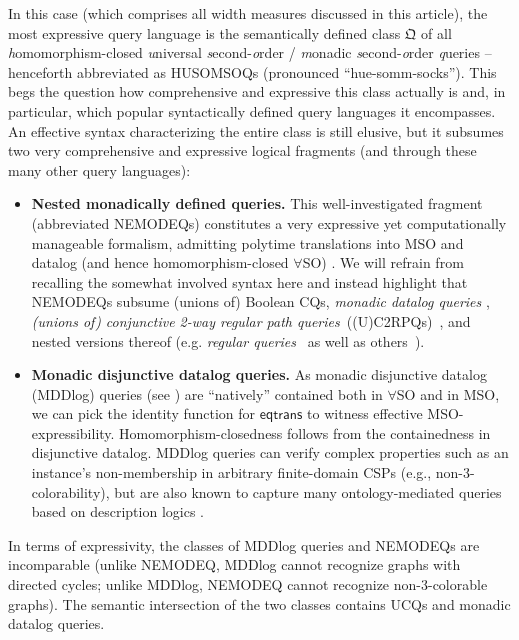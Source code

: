 \documentclass[10pt,a4paper]{amsart}
\theoremstyle{definition}
\numberwithin{equation}{section}
\theoremstyle{plain}
\theoremstyle{definition}
\newcommand{\remarkstart}{\color{black}}
\theoremstyle{myexample}
\theoremstyle{plain}
\theoremstyle{definition}
\newcommand{\fcn}[1]{\mathsf{#1}}
\begin{document}
\medskip {}
In this case (which comprises all width measures discussed in this article), the most expressive query language is the semantically defined class $\mathfrak{Q}$ of all \emph{h}omomorphism-closed \emph{u}niversal \emph{s}econd-\emph{o}rder / \emph{m}onadic \emph{s}econd-\emph{o}rder \emph{q}ueries -- henceforth abbreviated as HUSOMSOQs (pronounced ``hue-somm-socks''). This begs the question how comprehensive and expressive this class actually is and, in particular, which popular syntactically defined query languages it encompasses. An effective syntax characterizing the entire class is still elusive, but it subsumes two very comprehensive and expressive logical fragments (and through these many other query languages):

\begin{itemize}
\item
{\bf Nested monadically defined queries.}
This well-investigated fragment (abbreviated NEMODEQs) constitutes a very expressive yet computationally manageable formalism, admitting polytime translations into MSO and datalog (and hence homomorphism-closed $\forall$SO) \cite{RudKro13}.
We will refrain from recalling the somewhat involved syntax here and instead highlight that NEMODEQs subsume (unions of) Boolean CQs,
\emph{monadic datalog queries} \cite{Cosmadakis88}, \emph{(unions of) conjunctive 2-way regular path queries}~((U)C2RPQs)~\cite{FlorescuLS98}, and nested versions thereof (e.g. \emph{regular queries}~\cite{ReutterRV17} as well as others~\cite{BourhisKR14}).

\item
{\bf Monadic disjunctive datalog queries.}
 As monadic disjunctive datalog (MDDlog) queries (see ) are ``natively'' contained both in $\forall$SO and in MSO, we can pick the identity function for $\fcn{eqtrans}$ %
    to witness effective MSO-expressibility. Homomorphism-closedness follows from the containedness in disjunctive datalog. MDDlog queries can verify complex properties such as an instance's non-membership in arbitrary finite-domain CSPs (e.g., non-3-colorability), but are also known to capture many ontology-mediated queries based on description logics \cite{BienvenuCLW14,FeierKL19}.
\end{itemize}
In terms of expressivity, the classes of MDDlog queries and NEMODEQs are incomparable \remarkstart{}(unlike NEMODEQ, MDDlog cannot recognize graphs with directed cycles; unlike MDDlog, NEMODEQ cannot recognize non-3-colorable graphs)\color{black}. The semantic intersection of the two classes contains UCQs and monadic datalog queries.
\end{document}

